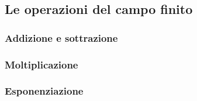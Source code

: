 \subsection{Le operazioni del campo finito} %



\textsf{\small }

\subsubsection{Addizione e sottrazione} %


\textsf{\small }

\subsubsection{Moltiplicazione}



\subsubsection{Esponenziazione} %

